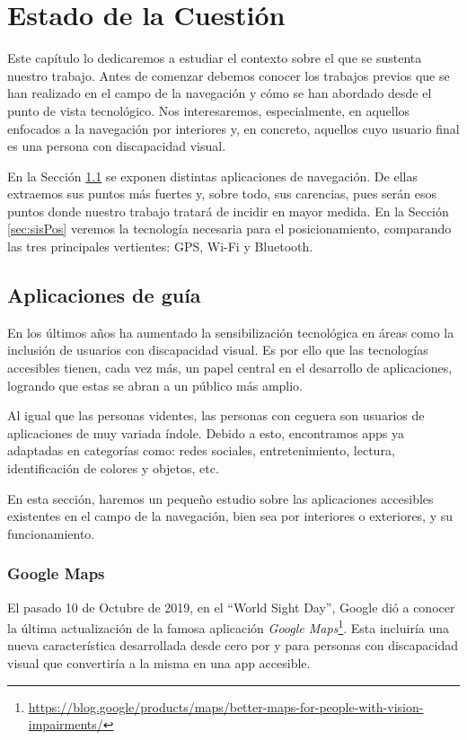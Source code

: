 \chapter{Estado de la Cuestión}
\label{cap:estadoDeLaCuestion}

Este capítulo lo dedicaremos a estudiar el contexto sobre el que se sustenta nuestro trabajo. Antes de comenzar debemos conocer los trabajos previos que se han realizado en el campo de la navegación y cómo se han abordado desde el punto de vista tecnológico. Nos interesaremos, especialmente, en aquellos enfocados a la navegación por interiores y, en concreto, aquellos cuyo usuario final es una persona con discapacidad visual. 

En la Sección \ref{sec:appGuia} se exponen distintas aplicaciones de navegación. De ellas extraemos sus puntos más fuertes y, sobre todo, sus carencias, pues serán esos puntos donde nuestro trabajo tratará de incidir en mayor medida. En la Sección \ref{sec:sisPos} veremos la tecnología necesaria para el posicionamiento, comparando las tres principales vertientes: GPS, Wi-Fi y Bluetooth. 

\section{Aplicaciones de guía}
\label{sec:appGuia}
En los últimos años ha aumentado la sensibilización tecnológica en áreas como la inclusión de usuarios con discapacidad visual. Es por ello que las tecnologías accesibles tienen, cada vez más, un papel central en el desarrollo de aplicaciones, logrando que estas se abran a un público más amplio.

Al igual que las personas videntes, las personas con ceguera son usuarios de aplicaciones de muy variada índole. Debido a esto, encontramos apps ya adaptadas en categorías como: redes sociales, entretenimiento, lectura, identificación de colores y objetos, etc. 

En esta sección, haremos un pequeño estudio sobre las aplicaciones accesibles existentes en el campo de la navegación, bien sea por interiores o exteriores, y su funcionamiento.
\subsection{Google Maps}
El pasado 10 de Octubre de 2019, en el ``World Sight Day'', Google dió a conocer la última actualización de la famosa aplicación \textit{Google Maps}\footnote{\url{https://blog.google/products/maps/better-maps-for-people-with-vision-impairments/}}. Esta incluiría una nueva característica desarrollada desde cero por y para personas con discapacidad visual que convertiría a la misma en una app accesible.

